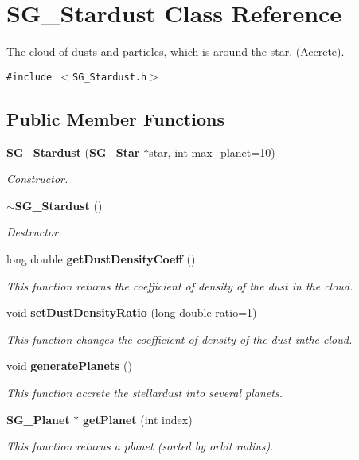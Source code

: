 \section{SG\_\-Stardust Class Reference}
\label{class_s_g___stardust}
The cloud of dusts and particles, which is around the star. (Accrete).  


{\tt \#include $<$SG\_\-Stardust.h$>$}

\subsection*{Public Member Functions}
\begin{CompactItemize}
\item 
{\bf SG\_\-Stardust} ({\bf SG\_\-Star} $\ast$star, int max\_\-planet=10)
\begin{CompactList}\small\item\em Constructor. \item\end{CompactList}\item 
{\bf $\sim$SG\_\-Stardust} ()\label{class_s_g___stardust_a1}

\begin{CompactList}\small\item\em Destructor. \item\end{CompactList}\item 
long double {\bf get\-Dust\-Density\-Coeff} ()\label{class_s_g___stardust_a2}

\begin{CompactList}\small\item\em This function returns the coefficient of density of the dust in the cloud. \item\end{CompactList}\item 
void {\bf set\-Dust\-Density\-Ratio} (long double ratio=1)
\begin{CompactList}\small\item\em This function changes the coefficient of density of the dust inthe cloud. \item\end{CompactList}\item 
void {\bf generate\-Planets} ()\label{class_s_g___stardust_a4}

\begin{CompactList}\small\item\em This function accrete the stellardust into several planets. \item\end{CompactList}\item 
{\bf SG\_\-Planet} $\ast$ {\bf get\-Planet} (int index)
\begin{CompactList}\small\item\em This function returns a planet (sorted by orbit radius). \item\end{CompactList}\end{CompactItemize}
